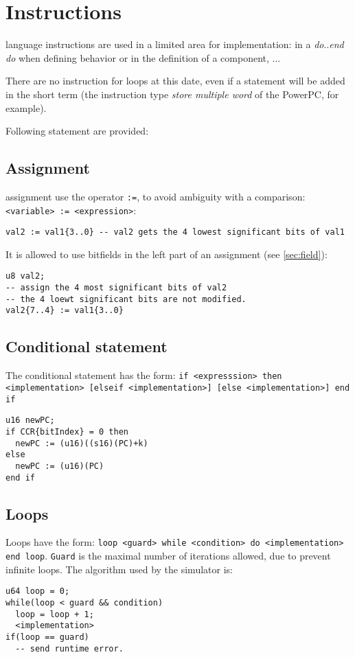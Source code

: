 \section{Instructions}
language instructions are used in a limited area for implementation: in a \emph{do}..\emph{end do} when defining behavior or in the definition of a component, ...

There are no instruction for loops at this date, even if a statement will be added in the short term (the instruction type \emph{store multiple word} of the PowerPC, for example).

Following statement are provided:
\subsection{Assignment}
assignment use the operator \texttt{:=}, to avoid ambiguity with a comparison: \texttt{<variable> :=  <expression>}:
\begin{lstlisting}
val2 := val1{3..0} -- val2 gets the 4 lowest significant bits of val1
\end{lstlisting}

It is allowed to use bitfields in the left part of an assignment (see \ref{sec:field}):
\begin{lstlisting}
u8 val2;
-- assign the 4 most significant bits of val2
-- the 4 loewt significant bits are not modified.
val2{7..4} := val1{3..0}
\end{lstlisting}

\subsection{Conditional statement}
The conditional statement has the form: \texttt{if <expresssion> then <implementation> [elseif <implementation>] [else <implementation>] end if}
\begin{lstlisting}
u16 newPC;
if CCR{bitIndex} = 0 then 
  newPC := (u16)((s16)(PC)+k) 
else 
  newPC := (u16)(PC)
end if 
\end{lstlisting}

\subsection{Loops}
Loops have the form: \texttt{loop <guard> while <condition> do <implementation> end loop}. \texttt{Guard} is the maximal number of iterations allowed, due to prevent infinite loops. The algorithm used by the simulator is:
\begin{lstlisting}
u64 loop = 0;
while(loop < guard && condition)
  loop = loop + 1;
  <implementation>
if(loop == guard)
  -- send runtime error.
\end{lstlisting}

